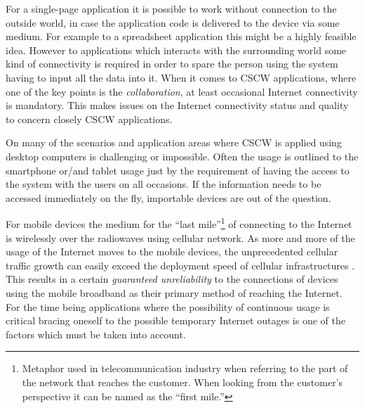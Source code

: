 


For a single-page application it is possible to work without connection to the outside world, in case the application code is delivered to the device via some medium. For example to a spreadsheet application this might be a highly feasible idea. However to applications which interacts with the surrounding world some kind of connectivity is required in order to spare the person using the system having to input all the data into it. When it comes to CSCW applications, where one of the key points is the \textit{collaboration}, at least occasional Internet connectivity is mandatory. This makes issues on the Internet connectivity status and quality to concern closely CSCW applications. %

On many of the scenarios and application areas where CSCW is applied using desktop computers is challenging or impossible. Often the usage is outlined to the smartphone or/and tablet usage just by the requirement of having the access to the system with the users on all occasions. If the information needs to be accessed immediately on the fly, importable devices are out of the question.

For mobile devices the medium for the ``last mile''\footnote{Metaphor used in telecommunication industry when referring to the part of the network that reaches the customer. When looking from the customer's perspective it can be named as the ``first mile.''} of connecting to the Internet is wirelessly over the radiowaves using cellular network. As more and more of the usage of the Internet moves to the mobile devices, the unprecedented cellular traffic growth can easily exceed the deployment speed of cellular infrastructures \cite{qian_web_2012}. This results in a certain \textit{guaranteed unreliability} to the connections of devices using the mobile broadband as their primary method of reaching the Internet. For the time being applications where the possibility of continuous usage is critical bracing oneself to the possible temporary Internet outages is one of the factors which must be taken into account.

